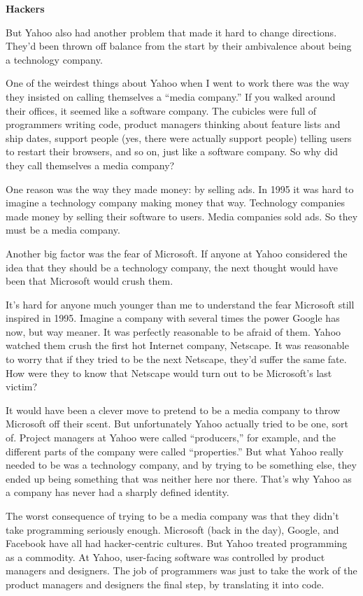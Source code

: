 \textbf{Hackers}

But Yahoo also had another problem that made it hard to change
directions. They'd been thrown off balance from the start by their
ambivalence about being a technology company.

One of the weirdest things about Yahoo when I went to work there was the
way they insisted on calling themselves a ``media company.'' If you
walked around their offices, it seemed like a software company. The
cubicles were full of programmers writing code, product managers
thinking about feature lists and ship dates, support people (yes, there
were actually support people) telling users to restart their browsers,
and so on, just like a software company. So why did they call themselves
a media company?

One reason was the way they made money: by selling ads. In 1995 it was
hard to imagine a technology company making money that way. Technology
companies made money by selling their software to users. Media companies
sold ads. So they must be a media company.

Another big factor was the fear of Microsoft. If anyone at Yahoo
considered the idea that they should be a technology company, the next
thought would have been that Microsoft would crush them.

It's hard for anyone much younger than me to understand the fear
Microsoft still inspired in 1995. Imagine a company with several times
the power Google has now, but way meaner. It was perfectly reasonable to
be afraid of them. Yahoo watched them crush the first hot Internet
company, Netscape. It was reasonable to worry that if they tried to be
the next Netscape, they'd suffer the same fate. How were they to know
that Netscape would turn out to be Microsoft's last victim?

It would have been a clever move to pretend to be a media company to
throw Microsoft off their scent. But unfortunately Yahoo actually tried
to be one, sort of. Project managers at Yahoo were called ``producers,''
for example, and the different parts of the company were called
``properties.'' But what Yahoo really needed to be was a technology
company, and by trying to be something else, they ended up being
something that was neither here nor there. That's why Yahoo as a company
has never had a sharply defined identity.

The worst consequence of trying to be a media company was that they
didn't take programming seriously enough. Microsoft (back in the day),
Google, and Facebook have all had hacker-centric cultures. But Yahoo
treated programming as a commodity. At Yahoo, user-facing software was
controlled by product managers and designers. The job of programmers was
just to take the work of the product managers and designers the final
step, by translating it into code.

